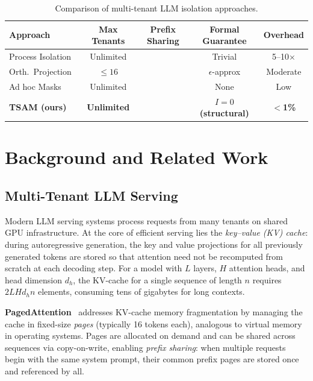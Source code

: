 \documentclass[11pt]{article}
\newcommand{\cmark}{\ding{51}}
\newcommand{\xmark}{\ding{55}}
\begin{document}
\begin{table}[t]
\centering
\caption{Comparison of multi-tenant LLM isolation approaches.}
\label{tab:comparison}
\vspace{4pt}
\small
\begin{tabular}{@{}lcccc@{}}
\toprule
\textbf{Approach} & \textbf{Max Tenants} & \textbf{Prefix Sharing} & \textbf{Formal Guarantee} & \textbf{Overhead} \\
\midrule
Process Isolation          & Unlimited & \xmark & Trivial       & 5--10$\times$ \\
Orth.\ Projection~\citep{li2024orthogonal} & $\leq 16$ & \xmark & $\epsilon$-approx & Moderate \\
Ad hoc Masks~\citep{gao2024attentionguard}  & Unlimited & \cmark & None          & Low \\
\textbf{TSAM (ours)}      & \textbf{Unlimited} & \cmark & \textbf{$I{=}0$ (structural)} & \textbf{$<$1\%} \\
\bottomrule
\end{tabular}
\end{table}

\section{Background and Related Work}
\label{sec:background}

\subsection{Multi-Tenant LLM Serving}
\label{sec:bg_serving}

Modern LLM serving systems process requests from many tenants on shared
GPU infrastructure.  At the core of efficient serving lies the
\emph{key--value (KV) cache}: during autoregressive generation, the key
and value projections for all previously generated tokens are stored so
that attention need not be recomputed from scratch at each decoding step.
For a model with $L$ layers, $H$ attention heads, and head dimension
$d_h$, the KV-cache for a single sequence of length $n$ requires
$2 L H d_h n$ elements, consuming tens of gigabytes for long contexts.

\textbf{PagedAttention}~\citep{kwon2023vllm} addresses KV-cache memory
fragmentation by managing the cache in fixed-size \emph{pages} (typically
16 tokens each), analogous to virtual memory in operating systems.  Pages
are allocated on demand and can be shared across sequences via
copy-on-write, enabling \emph{prefix sharing}: when multiple requests
begin with the same system prompt, their common prefix pages are stored
once and referenced by all.
\end{document}
